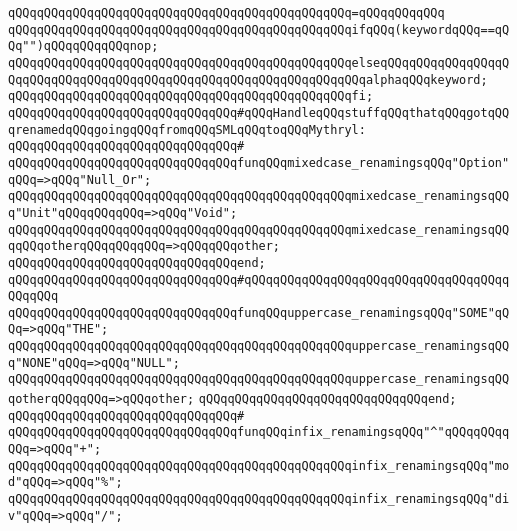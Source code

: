 \verb|qQQqqQQqqQQqqQQqqQQqqQQqqQQqqQQqqQQqqQQqqQQqqQQq=qQQqqQQqqQQq|\newline
\verb|qQQqqQQqqQQqqQQqqQQqqQQqqQQqqQQqqQQqqQQqqQQqqQQqifqQQq(keywordqQQq==qQQq"")qQQqqQQqqQQqnop;|\newline
\verb|qQQqqQQqqQQqqQQqqQQqqQQqqQQqqQQqqQQqqQQqqQQqqQQqelseqQQqqQQqqQQqqQQqqQQqqQQqqQQqqQQqqQQqqQQqqQQqqQQqqQQqqQQqqQQqqQQqqQQqalphaqQQqkeyword;|\newline
\verb|qQQqqQQqqQQqqQQqqQQqqQQqqQQqqQQqqQQqqQQqqQQqqQQqfi;|\newline
\newline
\verb|qQQqqQQqqQQqqQQqqQQqqQQqqQQqqQQq#qQQqHandleqQQqstuffqQQqthatqQQqgotqQQqrenamedqQQqgoingqQQqfromqQQqSMLqQQqtoqQQqMythryl:|\newline
\verb|qQQqqQQqqQQqqQQqqQQqqQQqqQQqqQQq#|\newline
\verb|qQQqqQQqqQQqqQQqqQQqqQQqqQQqqQQqfunqQQqmixedcase_renamingsqQQq"Option"qQQq=>qQQq"Null_Or";|\newline
\verb|qQQqqQQqqQQqqQQqqQQqqQQqqQQqqQQqqQQqqQQqqQQqqQQqmixedcase_renamingsqQQq"Unit"qQQqqQQqqQQq=>qQQq"Void";|\newline
\verb|qQQqqQQqqQQqqQQqqQQqqQQqqQQqqQQqqQQqqQQqqQQqqQQqmixedcase_renamingsqQQqqQQqotherqQQqqQQqqQQq=>qQQqqQQqother;|\newline
\verb|qQQqqQQqqQQqqQQqqQQqqQQqqQQqqQQqend;|\newline
\verb|qQQqqQQqqQQqqQQqqQQqqQQqqQQqqQQq#qQQqqQQqqQQqqQQqqQQqqQQqqQQqqQQqqQQqqQQqqQQq|\newline
\verb|qQQqqQQqqQQqqQQqqQQqqQQqqQQqqQQqfunqQQquppercase_renamingsqQQq"SOME"qQQq=>qQQq"THE";|\newline
\verb|qQQqqQQqqQQqqQQqqQQqqQQqqQQqqQQqqQQqqQQqqQQqqQQquppercase_renamingsqQQq"NONE"qQQq=>qQQq"NULL";|\newline
\verb|qQQqqQQqqQQqqQQqqQQqqQQqqQQqqQQqqQQqqQQqqQQqqQQquppercase_renamingsqQQqotherqQQqqQQq=>qQQqother;|\newline
\verb|qQQqqQQqqQQqqQQqqQQqqQQqqQQqqQQqend;|\newline
\verb|qQQqqQQqqQQqqQQqqQQqqQQqqQQqqQQq#|\newline
\verb|qQQqqQQqqQQqqQQqqQQqqQQqqQQqqQQqfunqQQqinfix_renamingsqQQq"^"qQQqqQQqqQQq=>qQQq"+";|\newline
\verb|qQQqqQQqqQQqqQQqqQQqqQQqqQQqqQQqqQQqqQQqqQQqqQQqinfix_renamingsqQQq"mod"qQQq=>qQQq"%";|\newline
\verb|qQQqqQQqqQQqqQQqqQQqqQQqqQQqqQQqqQQqqQQqqQQqqQQqinfix_renamingsqQQq"div"qQQq=>qQQq"/";|\newline
